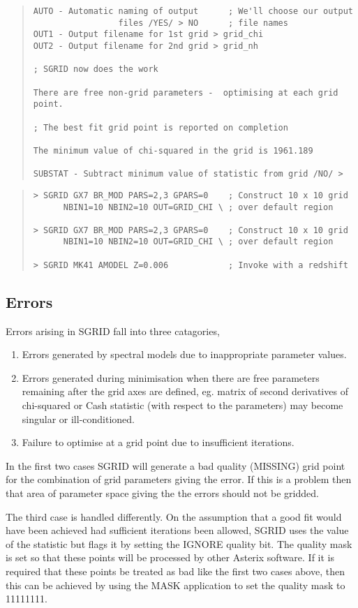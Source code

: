 \documentclass{book}
\renewcommand{\_}{{\tt\char'137}}     %
\begin{document}
\begin{quote}
\begin{verbatim}
AUTO - Automatic naming of output      ; We'll choose our output
                 files /YES/ > NO      ; file names
OUT1 - Output filename for 1st grid > grid_chi
OUT2 - Output filename for 2nd grid > grid_nh

; SGRID now does the work

There are free non-grid parameters -  optimising at each grid point.

; The best fit grid point is reported on completion

The minimum value of chi-squared in the grid is 1961.189

SUBSTAT - Subtract minimum value of statistic from grid /NO/ >
\end{verbatim}\end{quote}
\begin{quote}\begin{verbatim}
> SGRID GX7 BR_MOD PARS=2,3 GPARS=0    ; Construct 10 x 10 grid
      NBIN1=10 NBIN2=10 OUT=GRID_CHI \ ; over default region

> SGRID GX7 BR_MOD PARS=2,3 GPARS=0    ; Construct 10 x 10 grid
      NBIN1=10 NBIN2=10 OUT=GRID_CHI \ ; over default region

> SGRID MK41 AMODEL Z=0.006            ; Invoke with a redshift
\end{verbatim}\end{quote}
\subsection{Errors}
Errors arising in SGRID fall into three catagories,

\begin{enumerate}
\item Errors generated by spectral models due to inappropriate
parameter values.
\item Errors generated during minimisation when there are free
parameters remaining after the grid axes are defined, eg.
matrix of second derivatives of chi-squared or Cash
statistic (with respect to the parameters) may become
singular or ill-conditioned.
\item Failure to optimise at a grid point due to insufficient
iterations.
\end{enumerate}
In the first two cases SGRID will generate a bad quality (MISSING)
grid point for the combination of grid parameters giving the error.
If this is a problem then that area of parameter space giving the
the errors should not be gridded.

The third case is handled differently. On the assumption that a
good fit would have been achieved had sufficient iterations been
allowed, SGRID uses the value of the statistic but flags it by
setting the IGNORE quality bit. The quality mask is set so that
these points will be processed by other Asterix software. If it
is required that these points be treated as bad like the first
two cases above, then this can be achieved by using the MASK
application to set the quality mask to 11111111.
\end{document}
